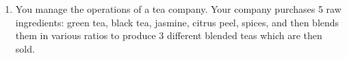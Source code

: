 \documentclass[11pt]{article}
\newcommand{\mb}[1]{\ensuremath{\boldsymbol{#1}}}
\begin{document}
\begin{enumerate}
%	
%	

\item You manage the operations of a tea company. Your company purchases 5 raw ingredients: green tea, black tea, jasmine,  citrus peel, spices, and then blends them in various ratios to produce 3 different blended teas which are then sold.   


\end{enumerate}
\end{document}
